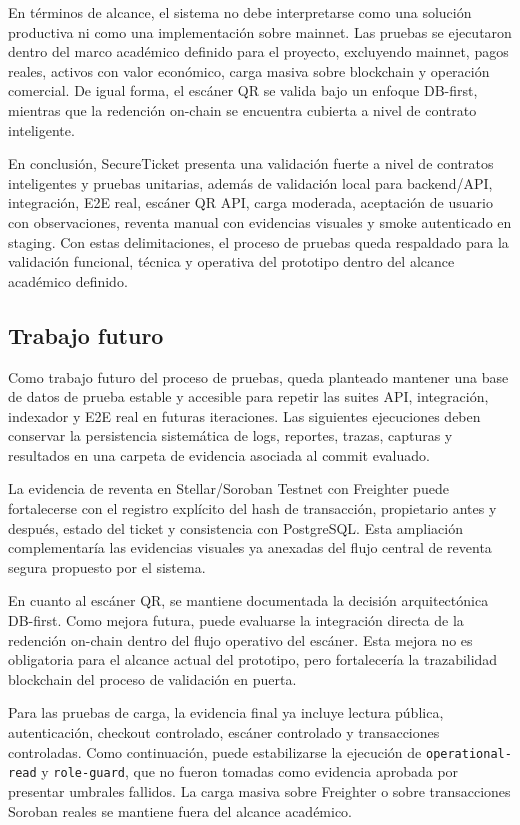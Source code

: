 \documentclass[12pt,letterpaper]{article}
\newcommand{\NombreProyecto}{SecureTicket}
\begin{document}
En términos de alcance, el sistema no debe interpretarse como una solución productiva ni como una implementación sobre mainnet. Las pruebas se ejecutaron dentro del marco académico definido para el proyecto, excluyendo mainnet, pagos reales, activos con valor económico, carga masiva sobre blockchain y operación comercial. De igual forma, el escáner QR se valida bajo un enfoque DB-first, mientras que la redención on-chain se encuentra cubierta a nivel de contrato inteligente.

En conclusión, \NombreProyecto{} presenta una validación fuerte a nivel de contratos inteligentes y pruebas unitarias, además de validación local para backend/API, integración, E2E real, escáner QR API, carga moderada, aceptación de usuario con observaciones, reventa manual con evidencias visuales y smoke autenticado en staging. Con estas delimitaciones, el proceso de pruebas queda respaldado para la validación funcional, técnica y operativa del prototipo dentro del alcance académico definido.

\subsection{Trabajo futuro}

Como trabajo futuro del proceso de pruebas, queda planteado mantener una base de datos de prueba estable y accesible para repetir las suites API, integración, indexador y E2E real en futuras iteraciones. Las siguientes ejecuciones deben conservar la persistencia sistemática de logs, reportes, trazas, capturas y resultados en una carpeta de evidencia asociada al commit evaluado.

La evidencia de reventa en Stellar/Soroban Testnet con Freighter puede fortalecerse con el registro explícito del hash de transacción, propietario antes y después, estado del ticket y consistencia con PostgreSQL. Esta ampliación complementaría las evidencias visuales ya anexadas del flujo central de reventa segura propuesto por el sistema.

En cuanto al escáner QR, se mantiene documentada la decisión arquitectónica DB-first. Como mejora futura, puede evaluarse la integración directa de la redención on-chain dentro del flujo operativo del escáner. Esta mejora no es obligatoria para el alcance actual del prototipo, pero fortalecería la trazabilidad blockchain del proceso de validación en puerta.

Para las pruebas de carga, la evidencia final ya incluye lectura pública, autenticación, checkout controlado, escáner controlado y transacciones controladas. Como continuación, puede estabilizarse la ejecución de \texttt{operational-read} y \texttt{role-guard}, que no fueron tomadas como evidencia aprobada por presentar umbrales fallidos. La carga masiva sobre Freighter o sobre transacciones Soroban reales se mantiene fuera del alcance académico.
\end{document}
